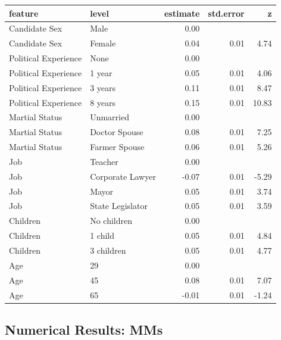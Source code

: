 \documentclass[a4paper,12pt]{article}\usepackage[]{graphicx}\usepackage[]{color}
\begin{document}
\begin{table}[ht]
\centering
\begin{tabular}{lp{1.5in}rrr}
  \hline
feature & level & estimate & std.error & z \\ 
  \hline
Candidate Sex & Male & 0.00 &  &  \\ 
  Candidate Sex & Female & 0.04 & 0.01 & 4.74 \\ 
  Political Experience & None & 0.00 &  &  \\ 
  Political Experience & 1 year & 0.05 & 0.01 & 4.06 \\ 
  Political Experience & 3 years & 0.11 & 0.01 & 8.47 \\ 
  Political Experience & 8 years & 0.15 & 0.01 & 10.83 \\ 
  Martial Status & Unmarried & 0.00 &  &  \\ 
  Martial Status & Doctor Spouse & 0.08 & 0.01 & 7.25 \\ 
  Martial Status & Farmer Spouse & 0.06 & 0.01 & 5.26 \\ 
  Job & Teacher & 0.00 &  &  \\ 
  Job & Corporate Lawyer & -0.07 & 0.01 & -5.29 \\ 
  Job & Mayor & 0.05 & 0.01 & 3.74 \\ 
  Job & State Legislator & 0.05 & 0.01 & 3.59 \\ 
  Children & No children & 0.00 &  &  \\ 
  Children & 1 child & 0.05 & 0.01 & 4.84 \\ 
  Children & 3 children & 0.05 & 0.01 & 4.77 \\ 
  Age & 29 & 0.00 &  &  \\ 
  Age & 45 & 0.08 & 0.01 & 7.07 \\ 
  Age & 65 & -0.01 & 0.01 & -1.24 \\ 
   \hline
\end{tabular}
\end{table}


\clearpage

\subsection{Numerical Results: MMs}
\end{document}
